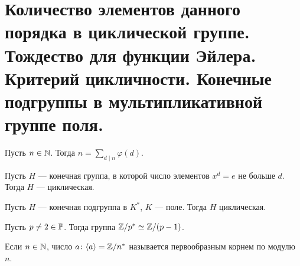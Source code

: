 % 
% 
\section{Количество элементов данного порядка в циклической группе. Тождество для функции Эйлера. Критерий цикличности. Конечные подгруппы в мультипликативной группе поля.}
\begin{lm}
    Пусть $ n \in  \mathbb{N}$. Тогда $ n = \sum\limits_{d \mid n}^{} \varphi (d) $.
\end{lm}
\begin{lm}
    Пусть $ H$ --- конечная группа, в которой число элементов $ x^{d} = e$ не больше $ d$. Тогда  $ H$ --- циклическая.
\end{lm}
\begin{thm}
    Пусть $ H$ --- конечная подгруппа в $ K^{*}$, $ K$ --- поле. Тогда $ H$ циклическая.
\end{thm}
\begin{cor}
    Пусть $ p\ne 2 \in \mathbb{P}$.  Тогда группа  $ \mathbb{Z} /p^{*} \simeq \mathbb{Z} /(p-1)$.
\end{cor}
\begin{defn}
    Если $ n \in \mathbb{N}$, число $ a\colon \langle a \rangle = \mathbb{Z} / n^{*}$ называется {\sf первообразным корнем по модулю $ n$}.  
\end{defn}
% 
